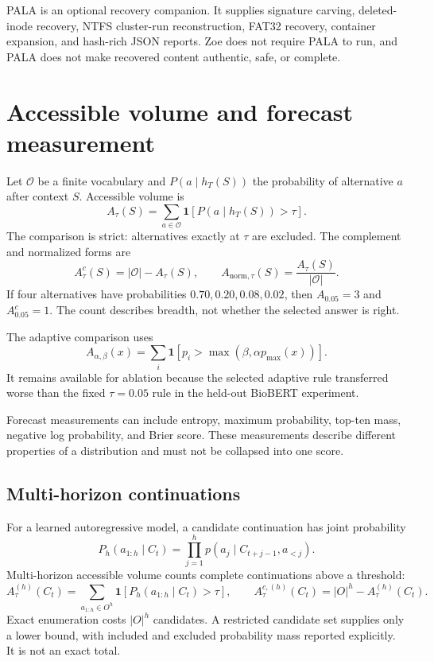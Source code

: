 \documentclass[11pt,a4paper]{article}
\begin{document}
PALA is an optional recovery companion. It supplies signature carving, deleted-inode recovery, NTFS cluster-run reconstruction, FAT32 recovery, container expansion, and hash-rich JSON reports. Zoe does not require PALA to run, and PALA does not make recovered content authentic, safe, or complete.

\section{Accessible volume and forecast measurement}
Let $\mathcal O$ be a finite vocabulary and $P(a\mid h_T(S))$ the probability of alternative $a$ after context $S$. Accessible volume is
\begin{equation}
A_\tau(S)=\sum_{a\in\mathcal O}\mathbf 1[P(a\mid h_T(S))>\tau].
\label{eq:av}
\end{equation}
The comparison is strict: alternatives exactly at $\tau$ are excluded. The complement and normalized forms are
\begin{equation}
A^c_\tau(S)=|\mathcal O|-A_\tau(S),\qquad
A_{\mathrm{norm},\tau}(S)=\frac{A_\tau(S)}{|\mathcal O|}.
\end{equation}
If four alternatives have probabilities $0.70,0.20,0.08,0.02$, then $A_{0.05}=3$ and $A^c_{0.05}=1$. The count describes breadth, not whether the selected answer is right.

The adaptive comparison uses
\begin{equation}
A_{\alpha,\beta}(x)=\sum_i\mathbf 1[p_i>\max(\beta,\alpha p_{\max}(x))].
\end{equation}
It remains available for ablation because the selected adaptive rule transferred worse than the fixed $\tau=0.05$ rule in the held-out BioBERT experiment.

Forecast measurements can include entropy, maximum probability, top-ten mass, negative log probability, and Brier score. These measurements describe different properties of a distribution and must not be collapsed into one score.

\subsection{Multi-horizon continuations}
For a learned autoregressive model, a candidate continuation has joint probability
\begin{equation}
P_h(a_{1:h}\mid C_t)=\prod_{j=1}^{h}p(a_j\mid C_{t+j-1},a_{<j}).
\end{equation}
Multi-horizon accessible volume counts complete continuations above a threshold:
\begin{equation}
A^{(h)}_\tau(C_t)=\sum_{a_{1:h}\in O^h}\mathbf 1[P_h(a_{1:h}\mid C_t)>\tau],
\qquad
A^{c,(h)}_\tau(C_t)=|O|^h-A^{(h)}_\tau(C_t).
\end{equation}
Exact enumeration costs $|O|^h$ candidates. A restricted candidate set supplies only a lower bound, with included and excluded probability mass reported explicitly. It is not an exact total.
\end{document}
